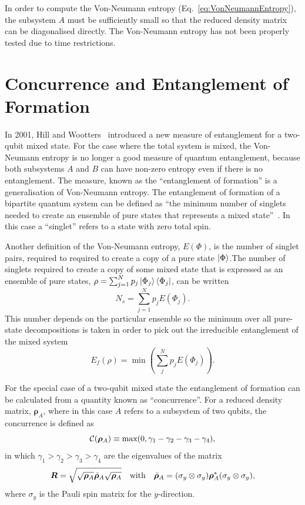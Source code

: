 In order to compute the Von-Neumann entropy (Eq.~\ref{eq:VonNeumannEntropy}), the subsystem $A$ must be sufficiently small so that the reduced density matrix can be diagonalised directly. The Von-Neumann entropy has not been properly tested due to time restrictions. 


\section{Concurrence and Entanglement of Formation}

In 2001, Hill and Wootters~\cite{Hill1997} introduced a new measure of entanglement for a two-qubit mixed state. For the case where the total system is mixed, the Von-Neumann entropy is no longer a good measure of quantum entanglement, because both subsystems $A$ and $B$ can have non-zero entropy even if there is no entanglement. The measure, known as the ``entanglement of formation'' is a generalisation of Von-Neumann entropy. The entanglement of formation of a bipartite quantum system can be defined as ``the minimum number of singlets needed to create an ensemble of pure states that represents a mixed state''~\cite{Wootters2001}. In this case a ``singlet'' refers to a state with zero total spin. 

Another definition of the Von-Neumann entropy, $E(\Phi)$, is the number of singlet pairs, required to required to create a copy of a pure state $\ket{\Phi}$\cite{Wootters2001}.The number of singlets required to create a copy of some mixed state that is expressed as an ensemble of pure states, $\rho = \sum_{j=1}^N p_j\ket{\Phi_j}\bra{\Phi_j}$, can be written
\begin{equation}
N_s = \sum_{j=1}^N p_jE(\Phi_j).
\end{equation}
This number depends on the particular ensemble so the minimum over all pure-state decompositions is taken in order to pick out the irreducible entanglement of the mixed system
\begin{equation}
E_f(\rho) = \min\left( \sum_{j}^N p_jE(\Phi_j) \right).
\end{equation}

For the special case of a two-qubit mixed state the entanglement of formation can be calculated from a quantity known as ``concurrence''. For a reduced density matrix, $\bm{\rho}_A$, where in this case $A$ refers to a subsystem of two qubits, the concurrence is defined as
\begin{equation}
\mathcal{C}(\bm{\rho}_A) \equiv \textnormal{max}(0, \gamma_1-\gamma_2-\gamma_3-\gamma_4),
\end{equation}
in which $\gamma_1 > \gamma_2 > \gamma_3 > \gamma_4$ are the eigenvalues of the matrix
\begin{equation}
\bm{R} = \sqrt{\sqrt{\bm{\rho}_A}\tilde{\bm{\rho}}_A\sqrt{\bm{\rho}_A}} \textnormal{\phantom{---}with\phantom{---}}  \tilde{\bm{\rho}}_A = (\sigma_y\otimes\sigma_y)\bm{\rho}_A^*(\sigma_y\otimes\sigma_y),
\end{equation}
where $\sigma_y$ is the Pauli spin matrix for the $y$-direction.

